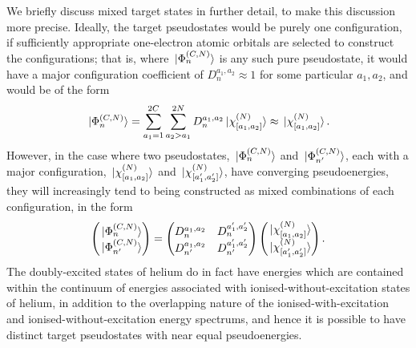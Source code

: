 \documentclass[]{article}
\begin{document}
We briefly discuss mixed target states in further detail, to make this
discussion more precise.
Ideally, the target pseudostates would be purely one configuration, if
sufficiently appropriate one-electron atomic orbitals are selected to construct
the configurations; that is, where $\ket*{\Phi_{n}^{(C, N)}}$ is any such
pure pseudostate, it would have a major configuration coefficient
of $D_{n}^{a_{1}, a_{2}} \approx 1$ for some particular $a_{1}, a_{2}$, and
would be of the form
\begin{equation*}
  \ket*{\Phi_{n}^{(C, N)}}
  =
  \sum_{a_{1} = 1}^{2C}
  \sum_{a_{2} > a_{1}}^{2N}
  D_{n}^{a_{1}, a_{2}}
  \ket*{\chi_{[a_{1}, a_{2}]}^{(N)}}
  \approx
  \ket*{\chi_{[a_{1}, a_{2}]}^{(N)}}
  .
\end{equation*}
However, in the case where two pseudostates,
$\ket*{\Phi_{n}^{(C, N)}}$ and $\ket*{\Phi_{n'}^{(C, N)}}$, each with a
major configuration, $\ket*{\chi_{[a_{1}, a_{2}]}^{(N)}}$ and
$\ket*{\chi_{[a_{1}', a_{2}']}^{(N)}}$, have converging
pseudoenergies, they will increasingly tend to being constructed as mixed
combinations of each configuration, in the form
\begin{equation*}
  \begin{pmatrix}
    \ket*{\Phi_{n}^{(C, N)}}
    \\
    \ket*{\Phi_{n'}^{(C, N)}}
  \end{pmatrix}
  =
  \begin{pmatrix}
    D_{n}^{a_{1}, a_{2}}
    &
    D_{n}^{a_{1}', a_{2}'}
    \\
    D_{n'}^{a_{1}, a_{2}}
    &
    D_{n'}^{a_{1}', a_{2}'}
  \end{pmatrix}
  \begin{pmatrix}
    \ket*{\chi_{[a_{1}, a_{2}]}^{(N)}}
    \\
    \ket*{\chi_{[a_{1}', a_{2}']}^{(N)}}
  \end{pmatrix}
  .
\end{equation*}
The doubly-excited states of helium do in fact have energies which are contained
within the continuum of energies associated with ionised-without-excitation
states of helium, in addition to the overlapping nature of the
ionised-with-excitation and ionised-without-excitation energy spectrums,
and hence it is possible to have distinct target pseudostates with near equal
pseudoenergies.
\end{document}
